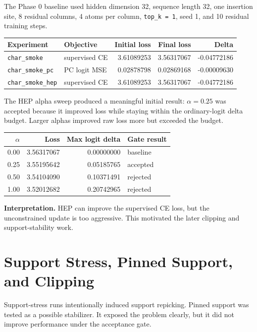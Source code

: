\documentclass[11pt]{article}
\begin{document}
The Phase 0 baseline used hidden dimension 32, sequence length 32, one
insertion site, 8 residual columns, 4 atoms per column, \texttt{top\_k = 1},
seed 1, and 10 residual training steps.

\begin{center}
\begin{tabular}{l l r r r}
\hline
Experiment & Objective & Initial loss & Final loss & Delta \\
\hline
\texttt{char\_smoke} & supervised CE & 3.61089253 & 3.56317067 & -0.04772186 \\
\texttt{char\_smoke\_pc} & PC logit MSE & 0.02878798 & 0.02869168 & -0.00009630 \\
\texttt{char\_smoke\_hep} & supervised CE & 3.61089253 & 3.56317067 & -0.04772186 \\
\hline
\end{tabular}
\end{center}

The HEP alpha sweep produced a meaningful initial result: $\alpha = 0.25$ was
accepted because it improved loss while staying within the ordinary-logit
delta budget. Larger alphas improved raw loss more but exceeded the budget.

\begin{center}
\begin{tabular}{r r r l}
\hline
$\alpha$ & Loss & Max logit delta & Gate result \\
\hline
0.00 & 3.56317067 & 0.00000000 & baseline \\
0.25 & 3.55195642 & 0.05185765 & accepted \\
0.50 & 3.54104090 & 0.10371491 & rejected \\
1.00 & 3.52012682 & 0.20742965 & rejected \\
\hline
\end{tabular}
\end{center}

\textbf{Interpretation.} HEP can improve the supervised CE loss, but the
unconstrained update is too aggressive. This motivated the later clipping and
support-stability work.

\section{Support Stress, Pinned Support, and Clipping}

Support-stress runs intentionally induced support repicking. Pinned support was
tested as a possible stabilizer. It exposed the problem clearly, but it did not
improve performance under the acceptance gate.
\end{document}
